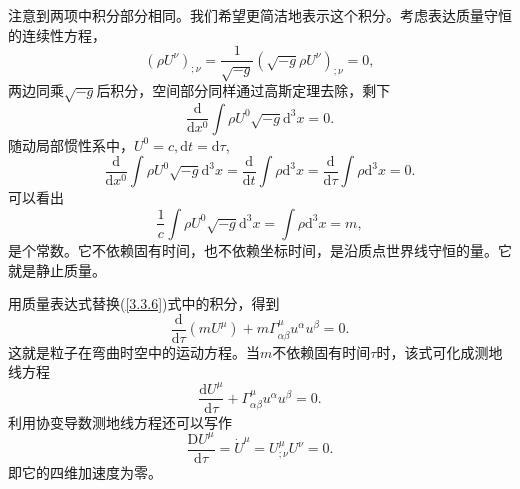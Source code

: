 \documentclass[11pt, a4paper, oneside, onecolumn]{ctexart}
\numberwithin{equation}{subsection}
\begin{document}
注意到两项中积分部分相同。我们希望更简洁地表示这个积分。考虑表达质量守恒的连续性方程，
\begin{equation}
\left(\rho U^{\nu}\right)_{;\nu}=\frac{1}{\sqrt{-g}}\left(\sqrt{-g}\rho U^{\nu}\right)_{;\nu}=0,
\end{equation}
两边同乘$\sqrt{-g}$后积分，空间部分同样通过高斯定理去除，剩下
\begin{equation}
\frac{\mathrm{d}}{\mathrm{d}x^{0}}\int\rho U^{0}\sqrt{-g}\mathrm{d}^{3}x=0.
\end{equation}
随动局部惯性系中，$U^{0}=c,\mathrm{d}t=\mathrm{d}\tau$,
\begin{equation}
\frac{\mathrm{d}}{\mathrm{d}x^{0}}\int\rho U^{0}\sqrt{-g}\mathrm{d}^{3}x=\frac{\mathrm{d}}{\mathrm{d}t}\int\rho\mathrm{d}^{3}x=\frac{\mathrm{d}}{\mathrm{d}\tau}\int\rho\mathrm{d}^{3}x=0.
\end{equation}
可以看出
\begin{equation}
\frac{1}{c}\int\rho U^{0}\sqrt{-g}\mathrm{d}^{3}x=\int\rho\mathrm{d}^{3}x=m,
\end{equation}
是个常数。它不依赖固有时间，也不依赖坐标时间，是沿质点世界线守恒的量。它就是静止质量。

用质量表达式替换(\ref{3.3.6})式中的积分，得到
\begin{equation}
\frac{\mathrm{d}}{\mathrm{d}\tau}\left(mU^{\mu}\right)+m\Gamma_{\alpha\beta}^{\mu}u^{\alpha}u^{\beta}=0.\label{3.3.11}
\end{equation}
这就是粒子在弯曲时空中的运动方程。当$m$不依赖固有时间$\tau$时，该式可化成测地线方程
\begin{equation}
\frac{\mathrm{d}U^{\mu}}{\mathrm{d}\tau}+\Gamma_{\alpha\beta}^{\mu}u^{\alpha}u^{\beta}=0.
\end{equation}
利用协变导数测地线方程还可以写作
\begin{equation}
\dfrac{\mathrm{D}U^{\mu}}{\mathrm{d}\tau}=\dot{U}^{\mu}=U^{\mu}_{;\nu}U^{\nu}=0.\label{3.3.13}
\end{equation}
即它的四维加速度为零。
\end{document}
